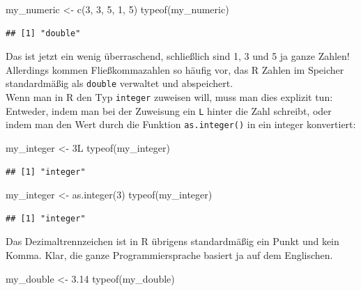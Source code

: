 \documentclass[
]{book}
\newenvironment{Shaded}{\begin{snugshade}}{\end{snugshade}}
\newcommand{\DecValTok}[1]{\textcolor[rgb]{0.00,0.00,0.81}{#1}}
\newcommand{\FloatTok}[1]{\textcolor[rgb]{0.00,0.00,0.81}{#1}}
\newcommand{\FunctionTok}[1]{\textcolor[rgb]{0.00,0.00,0.00}{#1}}
\newcommand{\NormalTok}[1]{#1}
\newcommand{\OtherTok}[1]{\textcolor[rgb]{0.56,0.35,0.01}{#1}}
\begin{document}
\begin{Shaded}
\begin{Highlighting}[]
\NormalTok{my\_numeric }\OtherTok{\textless{}{-}} \FunctionTok{c}\NormalTok{(}\DecValTok{3}\NormalTok{, }\DecValTok{3}\NormalTok{, }\DecValTok{5}\NormalTok{, }\DecValTok{1}\NormalTok{, }\DecValTok{5}\NormalTok{)}
\FunctionTok{typeof}\NormalTok{(my\_numeric)}
\end{Highlighting}
\end{Shaded}

\begin{verbatim}
## [1] "double"
\end{verbatim}

Das ist jetzt ein wenig überraschend, schließlich sind 1, 3 und 5 ja ganze Zahlen! Allerdings kommen Fließkommazahlen so häufig vor, das R Zahlen im Speicher standardmäßig als \texttt{double} verwaltet und abspeichert.\\
Wenn man in R den Typ \texttt{integer} zuweisen will, muss man dies explizit tun: Entweder, indem man bei der Zuweisung ein \texttt{L} hinter die Zahl schreibt, oder indem man den Wert durch die Funktion \texttt{as.integer()} in ein integer konvertiert:

\begin{Shaded}
\begin{Highlighting}[]
\NormalTok{my\_integer }\OtherTok{\textless{}{-}}\NormalTok{ 3L}
\FunctionTok{typeof}\NormalTok{(my\_integer)}
\end{Highlighting}
\end{Shaded}

\begin{verbatim}
## [1] "integer"
\end{verbatim}

\begin{Shaded}
\begin{Highlighting}[]
\NormalTok{my\_integer }\OtherTok{\textless{}{-}} \FunctionTok{as.integer}\NormalTok{(}\DecValTok{3}\NormalTok{)}
\FunctionTok{typeof}\NormalTok{(my\_integer)}
\end{Highlighting}
\end{Shaded}

\begin{verbatim}
## [1] "integer"
\end{verbatim}

Das Dezimaltrennzeichen ist in R übrigens standardmäßig ein Punkt und kein Komma. Klar, die ganze Programmiersprache basiert ja auf dem Englischen.

\begin{Shaded}
\begin{Highlighting}[]
\NormalTok{my\_double }\OtherTok{\textless{}{-}} \FloatTok{3.14}
\FunctionTok{typeof}\NormalTok{(my\_double)}
\end{Highlighting}
\end{Shaded}
\end{document}

